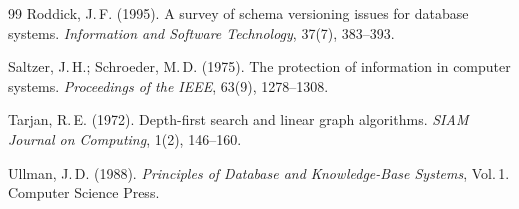 ﻿\documentclass[12pt,a4paper]{article}
\theoremstyle{definition}
\theoremstyle{remark}
\begin{document}
\begin{thebibliography}{99}
Roddick, J.\,F. (1995).
\newblock A survey of schema versioning issues for database systems.
\newblock \emph{Information and Software Technology}, 37(7), 383--393.

Saltzer, J.\,H.; Schroeder, M.\,D. (1975).
\newblock The protection of information in computer systems.
\newblock \emph{Proceedings of the IEEE}, 63(9), 1278--1308.

Tarjan, R.\,E. (1972).
\newblock Depth-first search and linear graph algorithms.
\newblock \emph{SIAM Journal on Computing}, 1(2), 146--160.

Ullman, J.\,D. (1988).
\newblock \emph{Principles of Database and Knowledge-Base Systems}, Vol.\,1.
\newblock Computer Science Press.

\end{thebibliography}
\end{document}
